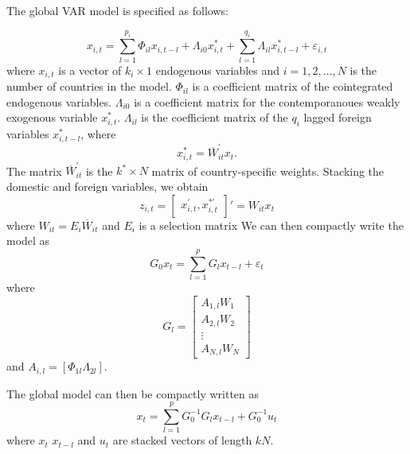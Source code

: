 \documentclass[titlepage,oneside,12pt]{article}
\newcommand{\?}{\stackrel{?}{=}}
\newcommand{\ol}{\overline}
\begin{document}
The global VAR model is specified as follows:

\begin{equation}
  \label{eq:1}
  x_{i,t} = \sum_{l=1}^{p_{i}}\Phi_{il}x_{i,t-l} + \Lambda_{i0}x_{i,t}^{*} + \sum_{l=1}^{q_{i}}\Lambda_{il}x_{i,t-l}^{*} + \varepsilon_{i,t}
\end{equation}
where $x_{i,t}$ is a vector of $k_{i}\times 1$ endogenous variables and $i = 1, 2, \ldots, N$ is the number of countries in the model.
$\Phi_{il}$ is a coefficient matrix of the cointegrated endogenous variables. $\Lambda_{i0}$ is a coefficient matrix for the contemporanoues weakly exogenous variable $x_{i,t}^{*}$. $\Lambda_{il}$ is the coefficient matrix of the $q_{i}$ lagged foreign variables $x_{i,t-l}^{*}$, where
\begin{equation}
  \label{eq:2}
  x_{i,t}^{*} = \ol{W}_{it}^{'}x_{t}.
\end{equation}
The matrix $\ol{W}_{it}^{'}$ is the $k^{*} \times N$ matrix of country-specific weights.
Stacking the domestic and foreign variables, we obtain
\begin{equation}
  \label{eq:3}
  z_{i,t} =
  \begin{bmatrix}
    x_{i,t}^{'}, x_{i,t}^{*'}
  \end{bmatrix}'  = W_{it}x_{t}
\end{equation}
where $W_{it} = E_{i}\ol{W}_{it}$ and $E_{i}$ is a selection matrix We
can then compactly write the model as
\begin{equation}
  \label{eq:4}
  G_{0}x_{t} = \sum_{l=1}^{p}G_{l}x_{t-l} + \varepsilon_{t}
\end{equation}
where
\begin{equation}
  \label{eq:5}
  G_{l} =
  \begin{bmatrix}
    A_{1,l}W_{1}\\ A_{2,l}W_{2}\\ \vdots \\A_{N,l}W_{N}
  \end{bmatrix}
\end{equation}
and $A_{i,l} = [\Phi_{1l}  \Lambda_{2l}]$.

The global model can then be compactly written as
\begin{equation}
  \label{eq:6}
  x_{t} = \sum_{l=1}^{p}G_{0}^{-1}G_{l }x_{t-l} + G_{0}^{-1}u_{t}
\end{equation}
where $x_{t}$ $x_{t-l}$ and $u_{t}$ are stacked vectors of length $kN$.
\end{document}
